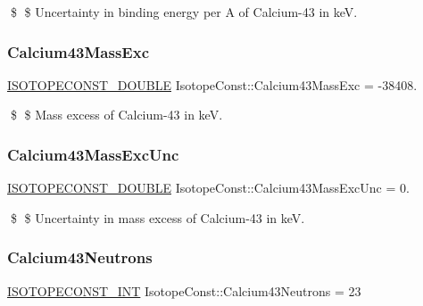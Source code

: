 \$ \$ Uncertainty in binding energy per A of Calcium-\/43 in keV. \mbox{\label{group___isotope_const-_calcium-_ca43_gac2d71f4cf4c6132330ebd32a8cfb37dc}} 
\subsubsection{\texorpdfstring{Calcium43\+Mass\+Exc}{Calcium43MassExc}}
{\footnotesize\ttfamily \mbox{\hyperlink{group___isotope_const-_macros_ga8f45a7272ce02c0b4c65c44636ed719a}{I\+S\+O\+T\+O\+P\+E\+C\+O\+N\+S\+T\+\_\+\+D\+O\+U\+B\+LE}} Isotope\+Const\+::\+Calcium43\+Mass\+Exc = -\/38408.}

\$ \$ Mass excess of Calcium-\/43 in keV. \mbox{\label{group___isotope_const-_calcium-_ca43_ga51654308b55863209a86a75509d44b68}} 
\subsubsection{\texorpdfstring{Calcium43\+Mass\+Exc\+Unc}{Calcium43MassExcUnc}}
{\footnotesize\ttfamily \mbox{\hyperlink{group___isotope_const-_macros_ga8f45a7272ce02c0b4c65c44636ed719a}{I\+S\+O\+T\+O\+P\+E\+C\+O\+N\+S\+T\+\_\+\+D\+O\+U\+B\+LE}} Isotope\+Const\+::\+Calcium43\+Mass\+Exc\+Unc = 0.}

\$ \$ Uncertainty in mass excess of Calcium-\/43 in keV. \mbox{\label{group___isotope_const-_calcium-_ca43_ga789094b6b3eccb7fbf7bb580540307a8}} 
\subsubsection{\texorpdfstring{Calcium43\+Neutrons}{Calcium43Neutrons}}
{\footnotesize\ttfamily \mbox{\hyperlink{group___isotope_const-_macros_ga5f18360b3e99483a35c32d789e62621c}{I\+S\+O\+T\+O\+P\+E\+C\+O\+N\+S\+T\+\_\+\+I\+NT}} Isotope\+Const\+::\+Calcium43\+Neutrons = 23}

